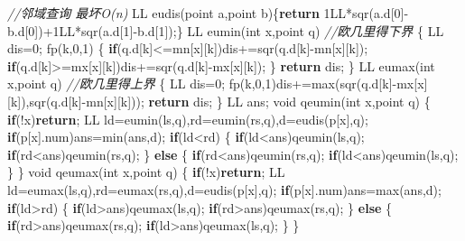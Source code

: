 \documentclass[
]{article}
\newenvironment{Shaded}{}{}
\newcommand{\BuiltInTok}[1]{#1}
\newcommand{\CommentTok}[1]{\textcolor[rgb]{0.38,0.63,0.69}{\textit{#1}}}
\newcommand{\ControlFlowTok}[1]{\textcolor[rgb]{0.00,0.44,0.13}{\textbf{#1}}}
\newcommand{\DataTypeTok}[1]{\textcolor[rgb]{0.56,0.13,0.00}{#1}}
\newcommand{\DecValTok}[1]{\textcolor[rgb]{0.25,0.63,0.44}{#1}}
\newcommand{\NormalTok}[1]{#1}
\begin{document}
\begin{Shaded}
\begin{Highlighting}[]
\CommentTok{//邻域查询 最坏O(n)}
\NormalTok{LL eudis(point a,point b)\{}\ControlFlowTok{return} \DecValTok{1}\BuiltInTok{LL}\NormalTok{*sqr(a.d[}\DecValTok{0}\NormalTok{]{-}b.d[}\DecValTok{0}\NormalTok{])+}\DecValTok{1}\BuiltInTok{LL}\NormalTok{*sqr(a.d[}\DecValTok{1}\NormalTok{]{-}b.d[}\DecValTok{1}\NormalTok{]);\}}
\NormalTok{LL eumin(}\DataTypeTok{int}\NormalTok{ x,point q) }\CommentTok{//欧几里得下界}
\NormalTok{\{}
\NormalTok{    LL dis=}\DecValTok{0}\NormalTok{;}
\NormalTok{    fp(k,}\DecValTok{0}\NormalTok{,}\DecValTok{1}\NormalTok{)}
\NormalTok{    \{}
        \ControlFlowTok{if}\NormalTok{(q.d[k]\textless{}=mn[x][k])dis+=sqr(q.d[k]{-}mn[x][k]);}
        \ControlFlowTok{if}\NormalTok{(q.d[k]\textgreater{}=mx[x][k])dis+=sqr(q.d[k]{-}mx[x][k]);}
\NormalTok{    \}}
    \ControlFlowTok{return}\NormalTok{ dis;}
\NormalTok{\}}
\NormalTok{LL eumax(}\DataTypeTok{int}\NormalTok{ x,point q) }\CommentTok{//欧几里得上界}
\NormalTok{\{}
\NormalTok{    LL dis=}\DecValTok{0}\NormalTok{;}
\NormalTok{    fp(k,}\DecValTok{0}\NormalTok{,}\DecValTok{1}\NormalTok{)dis+=max(sqr(q.d[k]{-}mx[x][k]),sqr(q.d[k]{-}mn[x][k]));}
    \ControlFlowTok{return}\NormalTok{ dis;}
\NormalTok{\}}
\NormalTok{LL ans;}
\DataTypeTok{void}\NormalTok{ qeumin(}\DataTypeTok{int}\NormalTok{ x,point q)}
\NormalTok{\{}
    \ControlFlowTok{if}\NormalTok{(!x)}\ControlFlowTok{return}\NormalTok{;}
\NormalTok{    LL ld=eumin(ls,q),rd=eumin(rs,q),d=eudis(p[x],q);}
    \ControlFlowTok{if}\NormalTok{(p[x].num)ans=min(ans,d);}
    \ControlFlowTok{if}\NormalTok{(ld\textless{}rd)}
\NormalTok{    \{}
        \ControlFlowTok{if}\NormalTok{(ld\textless{}ans)qeumin(ls,q);}
        \ControlFlowTok{if}\NormalTok{(rd\textless{}ans)qeumin(rs,q);}
\NormalTok{    \}}
    \ControlFlowTok{else}
\NormalTok{    \{}
        \ControlFlowTok{if}\NormalTok{(rd\textless{}ans)qeumin(rs,q);}
        \ControlFlowTok{if}\NormalTok{(ld\textless{}ans)qeumin(ls,q);}
\NormalTok{    \}}
\NormalTok{\}}
\DataTypeTok{void}\NormalTok{ qeumax(}\DataTypeTok{int}\NormalTok{ x,point q)}
\NormalTok{\{}
    \ControlFlowTok{if}\NormalTok{(!x)}\ControlFlowTok{return}\NormalTok{;}
\NormalTok{    LL ld=eumax(ls,q),rd=eumax(rs,q),d=eudis(p[x],q);}
    \ControlFlowTok{if}\NormalTok{(p[x].num)ans=max(ans,d);}
    \ControlFlowTok{if}\NormalTok{(ld\textgreater{}rd)}
\NormalTok{    \{}
        \ControlFlowTok{if}\NormalTok{(ld\textgreater{}ans)qeumax(ls,q);}
        \ControlFlowTok{if}\NormalTok{(rd\textgreater{}ans)qeumax(rs,q);}
\NormalTok{    \}}
    \ControlFlowTok{else}
\NormalTok{    \{}
        \ControlFlowTok{if}\NormalTok{(rd\textgreater{}ans)qeumax(rs,q);}
        \ControlFlowTok{if}\NormalTok{(ld\textgreater{}ans)qeumax(ls,q);}
\NormalTok{    \}}
\NormalTok{\}}


\end{Highlighting}
\end{Shaded}
\end{document}
